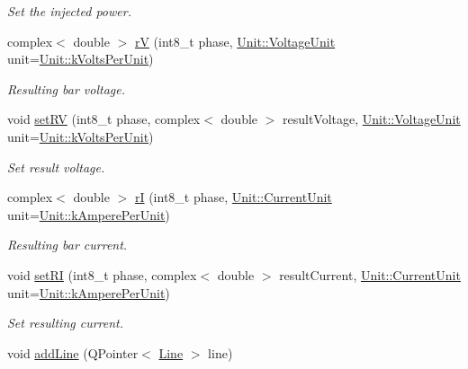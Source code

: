 \begin{DoxyCompactItemize}
\begin{DoxyCompactList}\small\item\em Set the injected power. \end{DoxyCompactList}\item 
complex$<$ double $>$ \hyperlink{group___models_ga6c83eb997f5038e0b9bbd5472582e0a8}{r\+V} (int8\+\_\+t phase, \hyperlink{class_unit_a55b07dfa9457e1eca2c7194fe0cfc3c1}{Unit\+::\+Voltage\+Unit} unit=\hyperlink{class_unit_a55b07dfa9457e1eca2c7194fe0cfc3c1ab44b1310b59fdcdc9df5bbea91da4206}{Unit\+::k\+Volts\+Per\+Unit})
\begin{DoxyCompactList}\small\item\em Resulting bar voltage. \end{DoxyCompactList}\item 
void \hyperlink{group___models_ga96ab396a6e953a0356f60adb1784ee37}{set\+R\+V} (int8\+\_\+t phase, complex$<$ double $>$ result\+Voltage, \hyperlink{class_unit_a55b07dfa9457e1eca2c7194fe0cfc3c1}{Unit\+::\+Voltage\+Unit} unit=\hyperlink{class_unit_a55b07dfa9457e1eca2c7194fe0cfc3c1ab44b1310b59fdcdc9df5bbea91da4206}{Unit\+::k\+Volts\+Per\+Unit})
\begin{DoxyCompactList}\small\item\em Set result voltage. \end{DoxyCompactList}\item 
complex$<$ double $>$ \hyperlink{group___models_ga50eb46f3510205a9d6cb5e6547fa86df}{r\+I} (int8\+\_\+t phase, \hyperlink{class_unit_a0794cf6c9682f48296dd4a5315389787}{Unit\+::\+Current\+Unit} unit=\hyperlink{class_unit_a0794cf6c9682f48296dd4a5315389787aeed3b50e464d581cb630181a3b6a0709}{Unit\+::k\+Ampere\+Per\+Unit})
\begin{DoxyCompactList}\small\item\em Resulting bar current. \end{DoxyCompactList}\item 
void \hyperlink{group___models_gaf7a406f8952b1e874c95c41b0955d250}{set\+R\+I} (int8\+\_\+t phase, complex$<$ double $>$ result\+Current, \hyperlink{class_unit_a0794cf6c9682f48296dd4a5315389787}{Unit\+::\+Current\+Unit} unit=\hyperlink{class_unit_a0794cf6c9682f48296dd4a5315389787aeed3b50e464d581cb630181a3b6a0709}{Unit\+::k\+Ampere\+Per\+Unit})
\begin{DoxyCompactList}\small\item\em Set resulting current. \end{DoxyCompactList}\item 
void \hyperlink{group___models_gabb1a3b7653d4e2327c4bf728210f197e}{add\+Line} (Q\+Pointer$<$ \hyperlink{class_line}{Line} $>$ line)

\end{DoxyCompactItemize}
